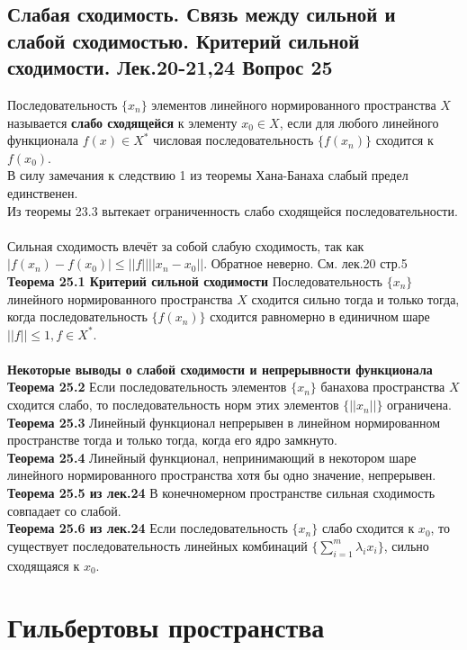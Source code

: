 \documentclass{article}
\begin{document}
\subsection{Слабая сходимость. Связь между сильной и слабой сходимостью. Критерий сильной сходимости. Лек.20-21,24 \textbf{Вопрос 25}}
	Последовательность $\{{x}_{n}\}$ элементов линейного
	нормированного пространства $X$ называется \textbf{слабо сходящейся} к
	элементу ${x}_{0}\in X$, если для любого линейного функционала $f(x)\in {X}^{*}$ числовая последовательность $\{f({x}_{n})\}$ сходится к $f({x}_{0})$.\\
	В силу замечания к следствию 1 из теоремы Хана-Банаха слабый предел
	единственен. \\
	Из теоремы 23.3 вытекает ограниченность слабо сходящейся
	последовательности.\\
	\\
	Сильная сходимость влечёт за собой слабую сходимость, так как $|f({x}_{n})-f({x}_{0})|\le ||f||||{x}_{n}-{x}_{0}||$. Обратное неверно. См. лек.20 стр.5\\
	\textbf{Теорема 25.1 Критерий сильной сходимости} Последовательность $\{{x}_{n}\}$ линейного нормированного
	пространства $X$ сходится сильно тогда и только тогда, когда
	последовательность $\{f({x}_{n})\}$ сходится равномерно в единичном шаре $||f||\le 1,f\in {X}^{*}$.\\
	\\
	\textbf{Некоторые выводы о слабой сходимости и непрерывности функционала}\\
	\textbf{Теорема 25.2} Если последовательность элементов  $\{{x}_{n}\}$ банахова пространства $X$ сходится слабо, то последовательность норм этих элементов $\{||{x}_{n}||\}$ ограничена.\\
	\textbf{Теорема 25.3} Линейный функционал непрерывен в линейном нормированном пространстве тогда и только тогда, когда его ядро замкнуто.\\
	\textbf{Теорема 25.4} Линейный функционал, непринимающий в некотором шаре линейного нормированного пространства хотя бы одно значение, непрерывен.\\
	\textbf{Теорема 25.5 из лек.24} В конечномерном пространстве сильная сходимость совпадает со слабой.\\
	\textbf{Теорема 25.6 из лек.24} Если последовательность $\{{x}_{n}\}$ слабо сходится к ${x}_{0}$, то существует последовательность линейных комбинаций $\{\sum_{i=1}^{m} {\lambda}_{i}{x}_{i}\}$, сильно сходящаяся к ${x}_{0}$.
\section{Гильбертовы пространства}
\end{document}
